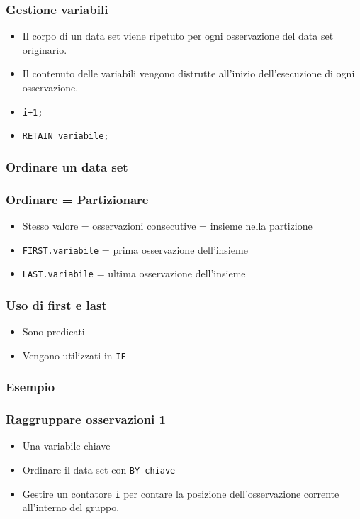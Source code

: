 \begin{frame}[containsverbatim]\frametitle{Gestione variabili}
  \begin{itemize}
  \item
    Il corpo di un data set viene ripetuto per ogni osservazione del data set originario.
  \item
    Il contenuto delle variabili vengono distrutte all'inizio dell'esecuzione di ogni osservazione.
  \item
    \verb!i+1;!
  \item
    \verb!RETAIN variabile;!
  \end{itemize}\end{frame}



\begin{frame}[containsverbatim]\frametitle{Ordinare un data set}
\end{frame}

\begin{frame}\frametitle{Ordinare = Partizionare}
  \begin{itemize}
  \item
    Stesso valore = osservazioni consecutive = insieme nella partizione
  \item
    \texttt{FIRST.variabile} =
    prima osservazione dell'insieme
  \item
    \texttt{LAST.variabile} =
    ultima osservazione dell'insieme
  \end{itemize}\end{frame}

\begin{frame}\frametitle{Uso di first  e last}
  \begin{itemize}
  \item
    Sono predicati
  \item
    Vengono utilizzati in \texttt{IF}
  \end{itemize}\end{frame}

\begin{frame}[containsverbatim]\frametitle{Esempio}
\end{frame}



\begin{frame}\frametitle{Raggruppare osservazioni 1}
  \begin{itemize}
  \item
    Una variabile \alert{chiave}
  \item
    Ordinare il data set con \texttt{BY chiave}
  \item
    Gestire un contatore \texttt{i} per contare la posizione dell'osservazione
    corrente all'interno del gruppo.
  \end{itemize}\end{frame}


